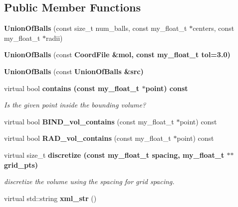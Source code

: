 \subsection*{Public Member Functions}
\begin{CompactItemize}
\item 
\textbf{Union\-Of\-Balls} (const size\_\-t num\_\-balls, const my\_\-float\_\-t $\ast$centers, const my\_\-float\_\-t $\ast$radii)\label{classASCbase_1_1UnionOfBalls_bdf71b8d8aa0c447e35e7b61b577f56c}

\item 
\textbf{Union\-Of\-Balls} (const \bf{Coord\-File} \&mol, const my\_\-float\_\-t tol=3.0)\label{classASCbase_1_1UnionOfBalls_93603c0f91e9a901bcf55ed17183f974}

\item 
\textbf{Union\-Of\-Balls} (const \bf{Union\-Of\-Balls} \&src)\label{classASCbase_1_1UnionOfBalls_525cc26074e6e938ee3f8e0a00580df5}

\item 
virtual bool \bf{contains} (const my\_\-float\_\-t $\ast$point) const \label{classASCbase_1_1UnionOfBalls_35d7a6372c343fd49af508223540dbfe}

\begin{CompactList}\small\item\em Is the given point inside the bounding volume? \item\end{CompactList}\item 
virtual bool \textbf{BIND\_\-vol\_\-contains} (const my\_\-float\_\-t $\ast$point) const \label{classASCbase_1_1UnionOfBalls_062e19950a34f2c92756ddd474d17db4}

\item 
virtual bool \textbf{RAD\_\-vol\_\-contains} (const my\_\-float\_\-t $\ast$point) const \label{classASCbase_1_1UnionOfBalls_85d46140c2f090aecb2e9b2970bc71c1}

\item 
virtual size\_\-t \bf{discretize} (const my\_\-float\_\-t spacing, my\_\-float\_\-t $\ast$$\ast$grid\_\-pts)\label{classASCbase_1_1UnionOfBalls_5f3ca248e1e5e8554dae45ac5c426c28}

\begin{CompactList}\small\item\em discretize the volume using the spacing for grid spacing. \item\end{CompactList}\item 
virtual std::string \textbf{xml\_\-str} ()\label{classASCbase_1_1UnionOfBalls_84e656c9ff4fef4f7a4707495715ff70}

\end{CompactItemize}
